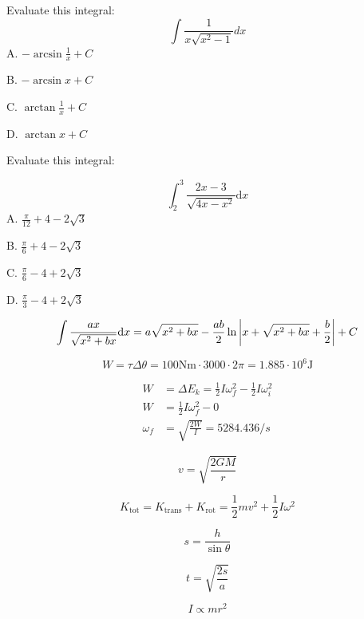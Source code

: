 \documentclass{article}
\numberwithin{equation}{section}
\begin{document}
\newpage

Evaluate this integral:
\[
    \int \frac{1}{x\sqrt{x^2-1}}{d}x
\]
A. $-\arcsin{\frac{1}{x}}+ C$

B. $-\arcsin{x} + C$

C. $\arctan{\frac{1}{x}} + C$

D. $\arctan{x} +C$ 


Evaluate this integral:

\[
    \int_2^3 \frac{2x-3}{\sqrt{4x-x^2}} \mathrm{d}x
\]  
A. $\frac{\pi}{12} + 4 - 2\sqrt{3}$

B. $\frac{\pi}{6} + 4 - 2\sqrt{3}$

C. $\frac{\pi}{6} - 4 + 2\sqrt{3}$

D. $\frac{\pi}{3} - 4 + 2\sqrt{3}$

\[
    \int \frac{ax}{\sqrt{x^2+bx}}\mathrm{d}x = a\sqrt{x^2+bx}-\frac{ab}{2}\ln{\abs{x+\sqrt{x^2+bx}+\frac{b}{2}}}+C
\]

\[
W = \tau \Delta \theta = 100 \text{Nm} \cdot 3000\cdot 2\pi = 1.885\cdot 10^6 \text{J}
\]

\[
\begin{split}
    W &= \Delta E_k = \frac{1}{2}I\omega_f^2 - \frac{1}{2}I\omega_i^2\\
    W &= \frac{1}{2}I\omega_f^2 - 0\\
    \omega_f &= \sqrt{\frac{2W}{I}} = 5284.436 /s
\end{split}
\]

\[
v = \sqrt{\frac{2GM}{r}}
\]

\[
K_{\text{tot}} = K_{\text{trans}} + K_{\text{rot}} = \frac{1}{2} mv^2 + \frac{1}{2}I\omega^2
\]

\[
s = \frac{h}{\sin \theta}
\]

\[
t = \sqrt{\frac{2s}{a}}
\]

\[
I \propto mr^2
\]
\end{document}
